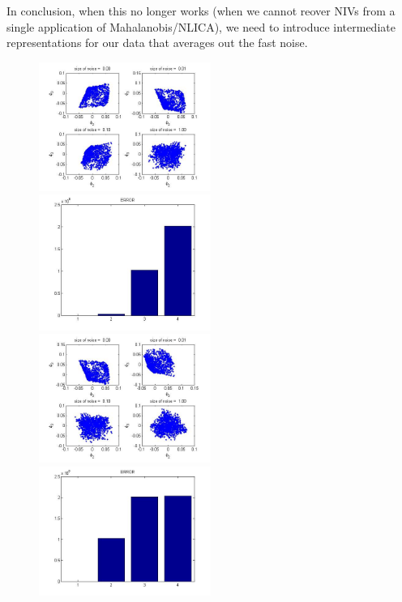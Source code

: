 \documentclass[12pt]{article}
\begin{document}
In conclusion, when this no longer works (when we cannot reover NIVs from a single application of Mahalanobis/NLICA), we need to introduce intermediate representations for our data that averages out the fast noise.

\begin{figure}[h!]
\includegraphics[width=0.5\textwidth]{embeddings_vary_with_noise_r1}
\includegraphics[width=0.5\textwidth]{error_with_noise}
\includegraphics[width=0.5\textwidth]{embeddings_vary_with_noise_r01}
\includegraphics[width=0.5\textwidth]{error_with_noise_01}

\end{figure}
\end{document}

